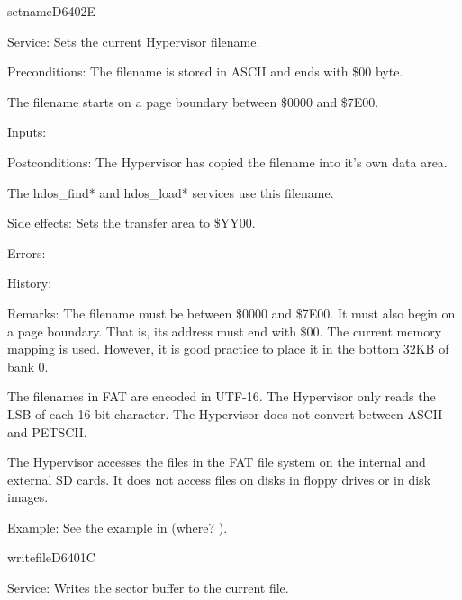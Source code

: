 %
\newpage
\begin{hyppotrap}{setname}{D640}{2E}
\item [Service:]
  Sets the current Hypervisor filename.
\item [Preconditions:]
  The filename is stored in ASCII and ends with \$00 byte.

  The filename starts on a page boundary between \$0000 and \$7E00.
\item [Inputs:]
\item [Postconditions:]
  The Hypervisor has copied the filename into it's own data area.

  The hdos\_find* and hdos\_load* services use this filename.
\item [Side effects:]
  Sets the transfer area to \$YY00.
\item [Errors:]
\item [History:]
\item [Remarks:]
  The filename must be between \$0000 and \$7E00. It must also begin on a
  page boundary. That is, its address must end with \$00. The current memory
  mapping is used. However, it is good practice to place it in the bottom 32KB
  of bank 0.

  The filenames in FAT are encoded in UTF-16. The Hypervisor only reads the LSB
  of each 16-bit character. The Hypervisor does not convert between ASCII and
  PETSCII.

  The Hypervisor accesses the files in the FAT file system on the internal and
  external SD cards. It does not access files on disks in floppy drives or in
  disk images.
\item [Example:]
  See the example in (where? \TODO).
\end{hyppotrap}


\newpage
\begin{hyppotrap}{writefile}{D640}{1C}
\item [Service:]
  Writes the sector buffer to the current file.
\notimplemented
\end{hyppotrap}



